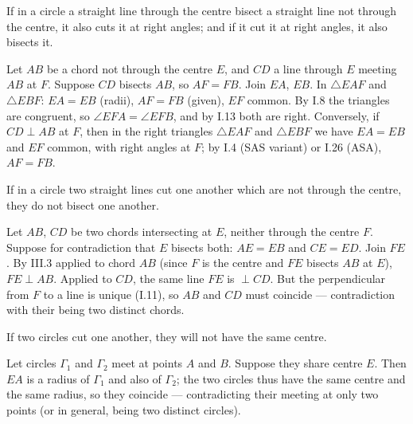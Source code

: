 \begin{claim}
\label{prop:III.3}
If in a circle a straight line through the centre bisect a straight
line not through the centre, it also cuts it at right angles; and if
it cut it at right angles, it also bisects it.
\end{claim}
\begin{evidence}
\label{ev:III.3}
Let $AB$ be a chord not through the centre $E$, and $CD$ a line
through $E$ meeting $AB$ at $F$.  Suppose $CD$ bisects $AB$, so
$AF = FB$.  Join $EA$, $EB$.  In $\triangle EAF$ and $\triangle
EBF$: $EA = EB$ (radii), $AF = FB$ (given), $EF$ common.  By I.8 the
triangles are congruent, so $\angle EFA = \angle EFB$, and by I.13
both are right.  Conversely, if $CD \perp AB$ at $F$, then in the
right triangles $\triangle EAF$ and $\triangle EBF$ we have $EA =
EB$ and $EF$ common, with right angles at $F$; by I.4 (SAS variant)
or I.26 (ASA), $AF = FB$.
\end{evidence}

\begin{claim}
\label{prop:III.4}
If in a circle two straight lines cut one another which are not
through the centre, they do not bisect one another.
\end{claim}
\begin{evidence}
\label{ev:III.4}
Let $AB$, $CD$ be two chords intersecting at $E$, neither through
the centre $F$.  Suppose for contradiction that $E$ bisects both:
$AE = EB$ and $CE = ED$.  Join $FE$.  By III.3 applied to chord
$AB$ (since $F$ is the centre and $FE$ bisects $AB$ at $E$), $FE
\perp AB$.  Applied to $CD$, the same line $FE$ is $\perp CD$.  But
the perpendicular from $F$ to a line is unique (I.11), so $AB$ and
$CD$ must coincide --- contradiction with their being two distinct
chords.
\end{evidence}

\begin{claim}
\label{prop:III.5}
If two circles cut one another, they will not have the same centre.
\end{claim}
\begin{evidence}
\label{ev:III.5}
Let circles $\Gamma_1$ and $\Gamma_2$ meet at points $A$ and $B$.
Suppose they share centre $E$.  Then $EA$ is a radius of $\Gamma_1$
and also of $\Gamma_2$; the two circles thus have the same centre
and the same radius, so they coincide --- contradicting their
meeting at only two points (or in general, being two distinct
circles).
\end{evidence}


